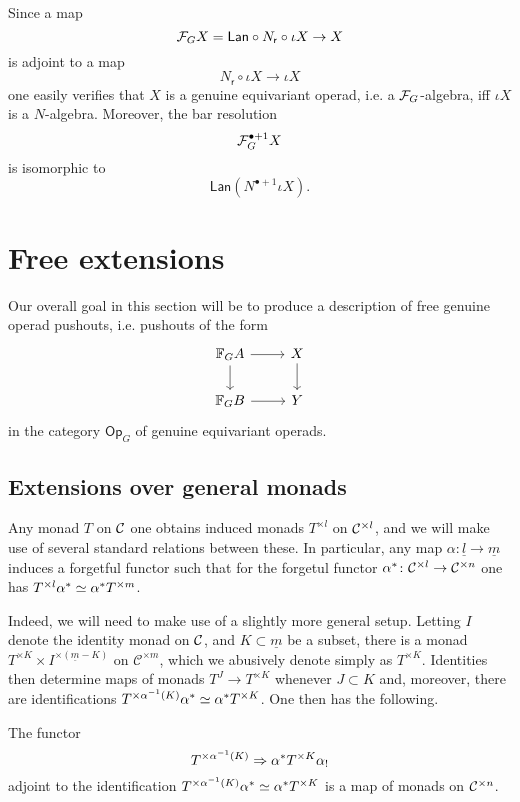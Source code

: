 \documentclass[a4paper,10pt]{article}%
\begin{document}
\begin{remark}\label{REPACKAGERES REM}
Since a map 
\[\mathcal F_G X =\mathsf{Lan} \circ N_{\mathsf{r}} \circ \iota X \to X\]
is adjoint to a map
\[N_{\mathsf{r}} \circ \iota X \to \iota X\]
one easily verifies that 
$X$ is a genuine equivariant operad, i.e. 
a $\mathcal F_G$-algebra, iff 
$\iota X$ is a $N$-algebra.
Moreover, the bar resolution
\[
	\mathcal F_G^{\bullet +1} X 
\]
is isomorphic to
\[
	\mathsf{Lan} \left( N^{\bullet +1} \iota X \right).
\]
\end{remark}


\section{Free extensions}

Our overall goal in this section will be to produce a description of free genuine operad pushouts, i.e. pushouts of the form
\[
\begin{tikzcd}
	\mathbb{F}_G A \ar{r} \ar{d} & X \ar{d}
\\
	\mathbb{F}_G B \ar{r} & Y
\end{tikzcd}
\]
in the category $\mathsf{Op}_G$ of genuine equivariant operads.



\subsection{Extensions over general monads}\label{EXTGENMON SEC}

Any monad $T$ on $\mathcal{C}$ one obtains induced monads $T^{\times l}$ on $\mathcal{C}^{\times l}$, and we will make use of several standard relations between these.
In particular, any map $\alpha \colon \underline{l} \to \underline{m}$ induces a forgetful functor
such that for the forgetul functor 
$\alpha^{\**} \colon \C^{\times l} \to \C^{\times n}$
one has $T^{\times l} \alpha^{\**} \simeq  \alpha^{\**} T^{\times m}$.


Indeed, we will need to make use of a slightly more general setup. Letting $I$ denote the identity monad on $\mathcal{C}$, and $K \subset \underline{m}$ be a subset, there is a monad $T^{\times K} \times I^{\times(\underline{m}-K)}$ on $\mathcal{C}^{\times m}$, which we abusively denote simply as $T^{\times K}$. Identities then determine maps of monads 
$T^{J} \to T^{\times K}$ whenever $J \subset K$
and, moreover, there are identifications
$T^{\times \alpha^{-1}(K)} \alpha^{\**} \simeq \alpha^{\**} T^{\times K}$.
One then has the following.


\begin{proposition}\label{MONADICFUN PROP}
	The functor
\begin{equation}\label{MONADFUNCTORALPHA EQ}
	T^{\times \alpha^{-1} (K)} \Rightarrow \alpha^{\**} T^{\times K} \alpha_{!}
\end{equation}
adjoint to the identification 
$T^{\times \alpha^{-1} (K)} \alpha^{\**} \simeq \alpha^{\**} T^{\times K}$
is a map of monads on $\mathcal{C}^{\times n}$.
\end{proposition}
\end{document}
